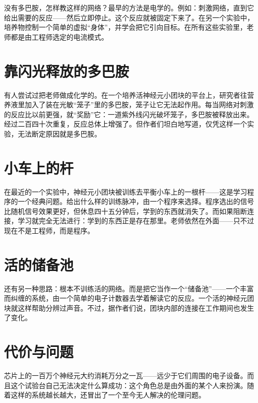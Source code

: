 没有多巴胺，怎样教这样的网络？最早的方法是电学的。例如：刺激网络，直到它给出需要的反应——然后立即停止。这个反应就被固定下来了。在另一个实验中，培养物控制一个简单的虚拟“身体”，并学会把它引向目标。在所有这些实验里，老师都是由工程师选定的电流模式。

\section*{靠闪光释放的多巴胺}

有人尝试过把老师做成化学的。在一个培养活神经元小团块的平台上，研究者往营养液里加入了装在光敏“笼子”里的多巴胺，笼子让它无法起作用。每当网络对刺激的反应比以前更强，就“奖励”它：一道紫外线闪光破坏笼子，多巴胺被释放出来。经过二百四十次重复，反应总体上增强了。但作者们坦白地写道，仅凭这样一个实验，无法断定原因就是多巴胺。

\section*{小车上的杆}

在最近的一个实验中，神经元小团块被训练去平衡小车上的一根杆——这是学习程序的一个经典问题。给出什么样的训练脉冲，由一个程序来选择。程序选出的信号比随机信号效果更好，但休息四十五分钟后，学到的东西就消失了。而如果阻断连接，学习就完全无法进行：学到的东西正是存在那里。老师依然在外面——只不过现在不是工程师，而是程序。

\section*{活的储备池}

还有另一种思路：根本不训练活的网络。而是把它当作一个“储备池”——一个丰富而纠缠的系统，由一个简单的电子计数器去学着解读它的反应。一个活的神经元团块就这样帮助分辨过声音。不过，据作者们说，团块内部的连接在工作期间也发生了变化。

\section*{代价与问题}

芯片上的一百万个神经元大约消耗万分之一瓦——远少于它们周围的电子设备。而且这个试验台自己无法决定什么算成功：这个角色总是由外面的某个人来扮演。随着这样的系统越长越大，还冒出了一个至今无人解决的伦理问题。

